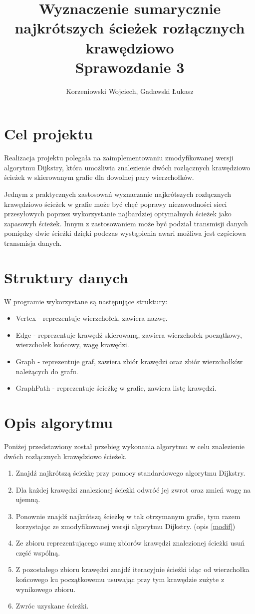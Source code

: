 \documentclass[10pt,a4paper]{article}
\author{Korzeniowski Wojciech, Gadawski Łukasz}
\title{Wyznaczenie sumarycznie najkrótszych ścieżek rozłącznych krawędziowo \\
	Sprawozdanie 3}
\begin{document}
\maketitle

\section{Cel projektu}
Realizacja projektu polegała na zaimplementowaniu zmodyfikowanej wersji algorytmu Dijkstry, która umożliwia znalezienie dwóch rozłącznych krawędziowo ścieżek w skierowanym grafie dla dowolnej pary wierzchołków.

Jednym z praktycznych zastosowań wyznaczanie najkrótszych rozłącznych krawędziowo ścieżek w grafie może być chęć poprawy niezawodności sieci przesyłowych poprzez wykorzystanie najbardziej optymalnych ścieżek jako zapasowyh ścieżek. Innym z zastosowaniem może być podział transmisji danych pomiędzy dwie ścieżki dzięki podczas wystąpienia awari możliwa jest częściowa transmisja danych.

\section{Struktury danych}
W programie wykorzystane są następujące struktury:
\begin{itemize}
	\item Vertex - reprezentuje wierzchołek, zawiera nazwę.
	\item Edge - reprezentuje krawędź skierowaną, zawiera wierzchołek początkowy, wierzchołek końcowy, wagę krawędzi.
	\item Graph - reprezentuje graf, zawiera zbiór krawędzi oraz zbiór wierzchołków	należących do grafu.
	\item GraphPath - reprezentuje ścieżkę w grafie, zawiera listę krawędzi.
\end{itemize}

\section{Opis algorytmu}
Poniżej przedstawiony został przebieg wykonania algorytmu w celu znalezienie dwóch rozłącznych krawędziowo ścieżek.

\begin{enumerate}
\item Znajdź najkrótszą ścieżkę przy pomocy standardowego algorytmu Dijkstry.
\item Dla każdej krawędzi znalezionej ścieżki odwróć jej zwrot oraz zmień wagę na ujemną.
\item Ponownie znajdź najkrótszą ścieżkę w tak otrzymanym grafie, tym razem korzystając ze zmodyfikowanej wersji algorytmu Dijkstry. (opis \ref{modif})
\item Ze zbioru reprezentującego sumę zbiorów krawędzi znalezionej ścieżki usuń część wspólną.
\item Z pozostałego zbioru krawędzi znajdź iteracyjnie ścieżki idąc od wierzchołka końcowego ku początkowemu usuwając przy tym krawędzie zużyte z wynikowego zbioru.
\item Zwróc uzyskane ścieżki.
\end{enumerate}
\end{document}
